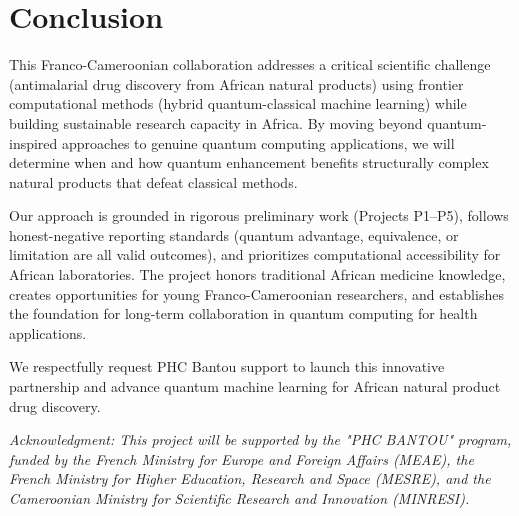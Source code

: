 \documentclass[11pt,a4paper]{article}
\begin{document}
\section{Conclusion}

This Franco-Cameroonian collaboration addresses a critical scientific challenge (antimalarial drug discovery from African natural products) using frontier computational methods (hybrid quantum-classical machine learning) while building sustainable research capacity in Africa. By moving beyond quantum-inspired approaches to genuine quantum computing applications, we will determine when and how quantum enhancement benefits structurally complex natural products that defeat classical methods.

Our approach is grounded in rigorous preliminary work (Projects P1--P5), follows honest-negative reporting standards (quantum advantage, equivalence, or limitation are all valid outcomes), and prioritizes computational accessibility for African laboratories. The project honors traditional African medicine knowledge, creates opportunities for young Franco-Cameroonian researchers, and establishes the foundation for long-term collaboration in quantum computing for health applications.

We respectfully request PHC Bantou support to launch this innovative partnership and advance quantum machine learning for African natural product drug discovery.

\vspace{1em}
\noindent\textit{Acknowledgment: This project will be supported by the "PHC BANTOU" program, funded by the French Ministry for Europe and Foreign Affairs (MEAE), the French Ministry for Higher Education, Research and Space (MESRE), and the Cameroonian Ministry for Scientific Research and Innovation (MINRESI).}
\end{document}
